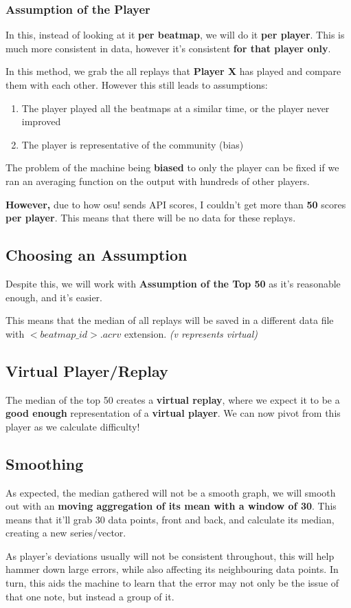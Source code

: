 \subsubsection{Assumption of the Player}
In this, instead of looking at it \textbf{per beatmap}, we will do it \textbf{per player}. This is much more consistent in data, however it's consistent \textbf{for that player only}.

In this method, we grab the all replays that \textbf{Player X} has played and compare them with each other. However this still leads to assumptions:

\begin{enumerate}
	\item The player played all the beatmaps at a similar time, or the player never improved
	\item The player is representative of the community (bias)
\end{enumerate}

The problem of the machine being \textbf{biased} to only the player can be fixed if we ran an averaging function on the output with hundreds of other players.

\textbf{However,} due to how osu! sends API scores, I couldn't get more than \textbf{50} scores \textbf{per player}. This means that there will be no data for these replays.

\subsection{Choosing an Assumption}

Despite this, we will work with \textbf{Assumption of the Top 50} as it's reasonable enough, and it's easier.

This means that the median of all replays will be saved in a different data file with $<beatmap\_id>.acrv$ extension. \textit{(v represents virtual)}

\subsection{Virtual Player/Replay}

The median of the top 50 creates a \textbf{virtual replay}, where we expect it to be a \textbf{good enough} representation of a \textbf{virtual player}. We can now pivot from this player as we calculate difficulty!

\subsection{Smoothing}

As expected, the median gathered will not be a smooth graph, we will smooth out with an \textbf{moving aggregation of its mean with a window of 30}. This means that it'll grab 30 data points, front and back, and calculate its median, creating a new series/vector.

As player's deviations usually will not be consistent throughout, this will help hammer down large errors, while also affecting its neighbouring data points. In turn, this aids the machine to learn that the error may not only be the issue of that one note, but instead a group of it.


